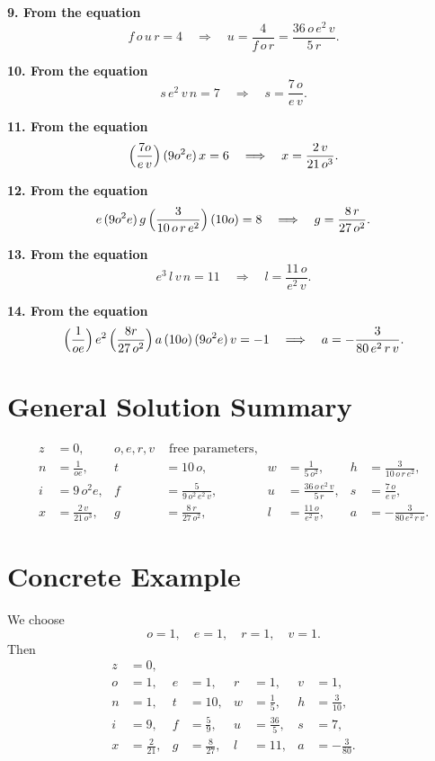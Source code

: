 \documentclass[12pt]{article}
\theoremstyle{plain}
\begin{document}
\bigskip
\noindent\textbf{9. From the equation}
\[
 f\,o\,u\,r = 4
 \quad\Longrightarrow\quad
 u = \frac{4}{f\,o\,r}
 = \frac{36\,o\,e^2\,v}{5\,r}.
\]

\bigskip
\noindent\textbf{10. From the equation}
\[
 s\,e^2\,v\,n = 7
 \quad\Longrightarrow\quad
 s = \frac{7\,o}{e\,v}.
\]

\bigskip
\noindent\textbf{11. From the equation}
\[
 \Bigl(\frac{7o}{e\,v}\Bigr)\,(9o^2e)\,x = 6
 \quad\Longrightarrow\quad
 x = \frac{2\,v}{21\,o^3}.
\]

\bigskip
\noindent\textbf{12. From the equation}
\[
 e\,(9o^2e)\,g\,\Bigl(\frac{3}{10\,o\,r\,e^2}\Bigr)\,(10o) = 8
 \quad\Longrightarrow\quad
 g = \frac{8\,r}{27\,o^2}.
\]

\bigskip
\noindent\textbf{13. From the equation}
\[
 e^3\,l\,v\,n = 11
 \quad\Longrightarrow\quad
 l = \frac{11\,o}{e^2\,v}.
\]

\bigskip
\noindent\textbf{14. From the equation}
\[
 \Bigl(\frac{1}{oe}\Bigr)\,e^2\,\Bigl(\frac{8r}{27\,o^2}\Bigr)\,a\,(10o)\,(9o^2e)\,v = -1
 \quad\Longrightarrow\quad
 a = -\frac{3}{80\,e^2\,r\,v}.
\]

\bigskip
\section*{General Solution Summary}
\[
\begin{aligned}
 z &= 0, 
 & o,e,r,v &\text{ free parameters},\\
 n &= \frac{1}{oe}, 
 & t &= 10\,o, 
 & w &= \frac{1}{5\,o^2}, 
 & h &= \frac{3}{10\,o\,r\,e^2},\\
 i &= 9\,o^2e, 
 & f &= \frac{5}{9\,o^2\,e^2\,v}, 
 & u &= \frac{36\,o\,e^2\,v}{5\,r}, 
 & s &= \frac{7\,o}{e\,v},\\
 x &= \frac{2\,v}{21\,o^3}, 
 & g &= \frac{8\,r}{27\,o^2}, 
 & l &= \frac{11\,o}{e^2\,v}, 
 & a &= -\frac{3}{80\,e^2\,r\,v}.
\end{aligned}
\]
\section*{Concrete Example}
We choose
\[
 o = 1,\quad
 e = 1,\quad
 r = 1,\quad
 v = 1.
\]
Then
\[
\begin{aligned}
 z &= 0,\\
 o &= 1, & e &= 1, & r &= 1, & v &= 1,\\
 n &= 1, & t &= 10, & w &= \frac{1}{5}, & h &= \frac{3}{10},\\
 i &= 9, & f &= \frac{5}{9}, & u &= \frac{36}{5}, & s &= 7,\\
 x &= \frac{2}{21}, & g &= \frac{8}{27}, & l &= 11, & a &= -\frac{3}{80}.
\end{aligned}
\]
\end{document}
